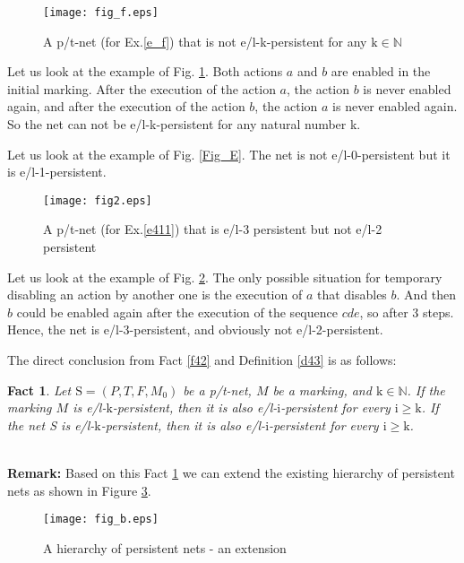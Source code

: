 \documentclass[a4paper]{llncs}
\newtheorem{fact}{Fact}
\begin{document}
\begin{example}
\label{e_f}
\begin{figure}[h]
\centering
\texttt{[image: fig\_f.eps]}
\caption{A p/t-net (for Ex.\ref{e_f}) that is not e/l-k-persistent for any $\mathrm{k}\in \mathbb{N}$}
\label{Fig_F}
\end{figure}

Let us look at the example of Fig. \ref{Fig_F}. Both actions $a$ and $b$ are enabled in the initial marking. After the execution of the action $a$, the action $b$ is never enabled again, and after the execution of the action $b$, the action $a$ is never enabled again. So the net can not be e/l-k-persistent for any natural number k.
\end{example}

\begin{example}
Let us look at the example of Fig. \ref{Fig_E}. The net is not e/l-0-persistent but it is e/l-1-persistent.
\end{example}
\begin{example}
\label{e411}

\begin{figure}[h]
\centering
\texttt{[image: fig2.eps]}
\caption{A p/t-net (for Ex.\ref{e411}) that is e/l-3 persistent but not e/l-2 persistent}
\label{Fig2}
\end{figure}

Let us look at the example of Fig. \ref{Fig2}. The only possible situation for temporary disabling an action by another one is the execution of $a$ that disables $b$. And then $b$ could be enabled again after the execution of the sequence $cde$, so after 3 steps. Hence, the net is e/l-3-persistent, and obviously not e/l-2-persistent.
\end{example}
The direct conclusion from Fact \ref{f42} and Definition \ref{d43} is as follows:
\begin{fact}
\label{f44}
Let $\mathrm{S}=(P,T,F,M_0)$ be a p/t-net, $M$ be a marking, and $\mathrm{k}\in\mathbb{N}$.
If the marking $M$ is e/l-$\mathrm{k}$-persistent, then it is also e/l-$\mathrm{i}$-persistent for every $\mathrm{i}\geq \mathrm{k}$.
If the net S is e/l-$\mathrm{k}$-persistent, then it is also e/l-$\mathrm{i}$-persistent for every $\mathrm{i}\geq \mathrm{k}$.
\end{fact}
\mbox{ }\\
\textbf{Remark:} Based on this Fact \ref{f44} we can extend the existing hierarchy of persistent nets as shown in Figure \ref{FigB}.
\begin{figure}[h]
\centering
\texttt{[image: fig\_b.eps]}
\caption{A hierarchy of persistent nets - an extension}
\label{FigB}
\end{figure}
\end{document}
